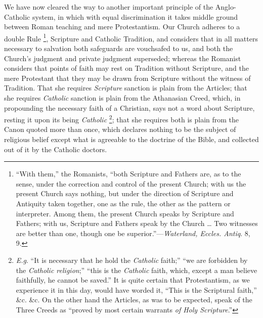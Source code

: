We have now cleared the way to another important principle of the
Anglo-Catholic system, in which with equal discrimination it takes
middle ground between Roman teaching and mere Protestantism. Our
Church adheres to a double Rule \footnote{``With them,'' the Romanists,
``both Scripture and Fathers are, as to the sense, under the
correction and control of the present Church; with us the present
Church says nothing, but under the direction of Scripture and
Antiquity taken together, one as the rule, the other as the pattern or
interpreter. Among them, the present Church speaks by Scripture and
Fathers; with us, Scripture and Fathers speak by the Church … Two
witnesses are better than one, though one be superior.''—\emph{Waterland,
Eccles. Antiq}. 8, 9.}, Scripture and Catholic Tradition, and considers that in all
matters necessary to salvation both safeguards are vouchsafed to us,
and both the Church's judgment and private judgment superseded;
whereas the Romanist considers that points of faith may rest on
Tradition without Scripture, and the mere Protestant that they may be
drawn from Scripture without the witness of Tradition. That she
requires \emph{Scripture} sanction is plain from the Articles;
that she requires \emph{Catholic} sanction is plain from the
Athanasian Creed, which, in propounding the necessary faith of a
Christian, says not a word about Scripture, resting it upon its being \emph{Catholic}
\footnote{\emph{E.g}. ``It is necessary that he
hold the \emph{Catholic} faith;'' ``we are forbidden by the \emph{Catholic
religion};'' ``this is the \emph{Catholic} faith, which,
except a man believe faithfully, he cannot be saved.'' It is quite
certain that Protestantism, as we experience it in this day, would
have worded it, ``This is the Scriptural faith,'' \&c.
\&c. On the other hand the Articles, as was to be expected, speak
of the Three Creeds as ``proved by most certain warrants \emph{of
Holy Scripture}.''}; that she requires both
is plain from the Canon quoted more than once, which declares nothing
to be the subject of religious belief except what is agreeable to the
doctrine of the Bible, and collected out of it by the Catholic
doctors.

